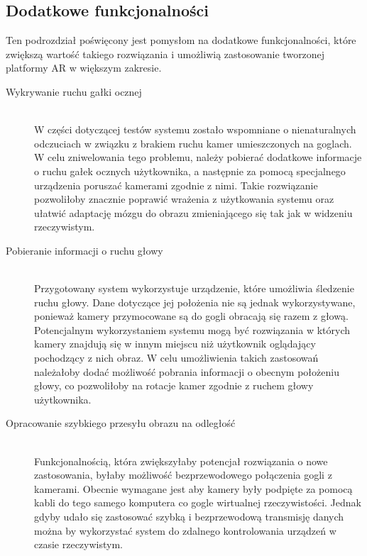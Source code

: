 \documentclass[a4paper,11pt,twoside]{report}
\theoremstyle{definition}
\begin{document}
\subsection{Dodatkowe funkcjonalności}

Ten podrozdział poświęcony jest pomysłom na dodatkowe funkcjonalności, które zwiększą wartość takiego rozwiązania i umożliwią zastosowanie tworzonej platformy AR w większym zakresie.

\begin{description}
\item [Wykrywanie ruchu gałki ocznej] \hfill \\
W części dotyczącej testów systemu zostało wspomniane o nienaturalnych odczuciach w związku z brakiem ruchu kamer umieszczonych na goglach. W celu zniwelowania tego problemu, należy pobierać dodatkowe informacje o ruchu gałek ocznych użytkownika, a następnie za pomocą specjalnego urządzenia poruszać kamerami zgodnie z nimi. Takie rozwiązanie pozwoliłoby znacznie poprawić wrażenia z użytkowania systemu oraz ułatwić  adaptację mózgu do obrazu zmieniającego się tak jak w widzeniu rzeczywistym.

\item [Pobieranie informacji o ruchu głowy] \hfill \\
Przygotowany system wykorzystuje urządzenie, które umożliwia śledzenie ruchu głowy. Dane dotyczące jej położenia nie są jednak wykorzystywane, ponieważ kamery przymocowane są do gogli obracają się razem z głową. Potencjalnym wykorzystaniem systemu mogą być rozwiązania w których kamery znajdują się w innym miejscu niż użytkownik oglądający pochodzący z nich obraz. W celu umożliwienia takich zastosowań należałoby dodać możliwość pobrania informacji o obecnym położeniu głowy, co pozwoliłoby na rotacje kamer zgodnie z ruchem  głowy użytkownika.

\item [Opracowanie szybkiego przesyłu obrazu na odległość] \hfill \\
Funkcjonalnością, która zwiększyłaby potencjał rozwiązania o nowe zastosowania, byłaby możliwość bezprzewodowego połączenia gogli z kamerami. Obecnie wymagane jest aby kamery były podpięte za pomocą kabli do tego samego komputera co gogle wirtualnej rzeczywistości. Jednak gdyby udało się zastosować szybką i bezprzewodową transmisję danych można by wykorzystać system do zdalnego kontrolowania urządzeń w czasie rzeczywistym.

\end{description}
\end{document}

